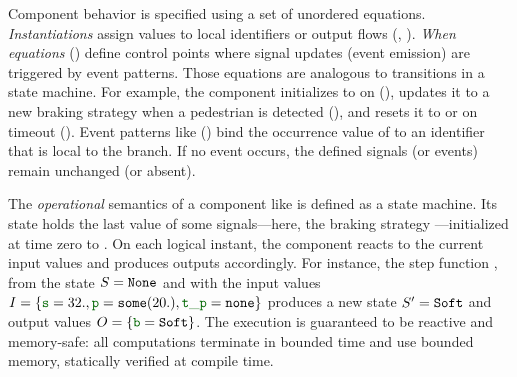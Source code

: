 Component behavior is specified using a set of unordered equations. \emph{Instantiations} assign
values to local identifiers or output flows (, ).
\emph{When equations} () define control points where
signal updates (\resp event emission) are triggered by event patterns. Those equations are analogous
to transitions in a state machine. For example, the component  initializes
 to \No on  (), updates it to a new braking strategy
when a pedestrian is detected (), and resets it to \Soft or \No on timeout
(). Event patterns like  ()
bind the occurrence value of  to an identifier  that is local to the branch. If no
event occurs, the defined signals (or events) remain unchanged (or absent).

The \emph{operational} semantics of a component like  is defined as a
state machine. Its state holds the last value of some signals---here, the braking strategy
---initialized at time zero to \No. On each logical instant, the component reacts to
the current input values and produces outputs accordingly. For instance, the step function
, from the state $S=\mathtt{{None}}$ and with the input values
$I=\{\idf{s}=32., \idf{p}=\some{20.}, \idf{t\_p}=\none\}$ produces a new state
$S'=\mathtt{{Soft}}$ and output values $O= \{\idf{b}=\Soft\}$.
The execution is guaranteed to be reactive and memory-safe: all computations terminate in bounded
time and use bounded memory, statically verified at compile time.


